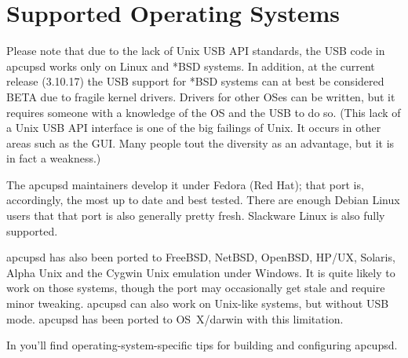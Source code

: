 \label{Supported-Operating-Systems_003b}
\section*{Supported Operating Systems}

\label{index-Supported-OSes-8}
\label{index-OSes-Supported-9}
Please note that due to the lack of Unix USB API standards, the USB code in
apcupsd works only on Linux and *BSD systems. In addition, at the current
release (3.10.17) the USB support for *BSD systems can at best be considered
BETA due to fragile kernel drivers. Drivers for other OSes can be written, but
it requires someone with a knowledge of the OS and the USB to do so.  (This
lack of a Unix USB API interface is one of the big failings of Unix.  It
occurs in other areas such as the GUI. Many people tout the diversity as an
advantage, but it is in fact a weakness.)  

The apcupsd maintainers develop it under Fedora (Red Hat); that port is,
accordingly, the most up to date and best tested.  There are enough Debian
Linux users that that port is also generally pretty fresh.  Slackware Linux is
also fully supported.  

apcupsd has also been ported to FreeBSD, NetBSD, OpenBSD, HP/UX, Solaris,
Alpha Unix and the Cygwin Unix emulation under Windows. It is quite likely to
work on those systems, though the port may occasionally get stale and require
minor tweaking.  apcupsd can also work on Unix-like systems, but without
USB mode.  apcupsd has been ported to OS~X/darwin with this limitation.















In 
you'll find operating-system-specific tips for building and configuring
apcupsd.  
